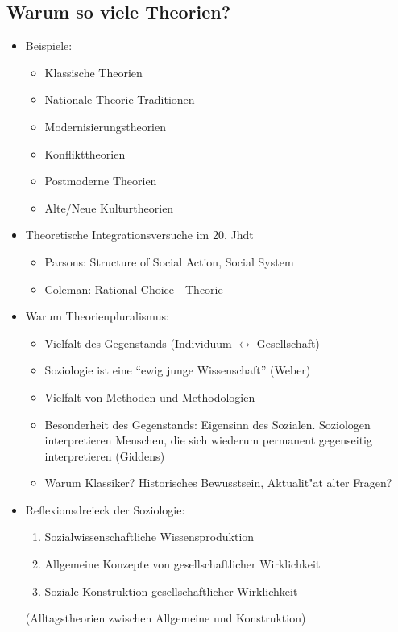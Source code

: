 \subsection{Warum so viele Theorien?}
\begin{itemize}
	\item
		Beispiele:
		\begin{itemize}
			\item
				Klassische Theorien
			\item
				Nationale Theorie-Traditionen
			\item
				Modernisierungstheorien
			\item
				Konflikttheorien
			\item
				Postmoderne Theorien
			\item
				Alte/Neue Kulturtheorien
		\end{itemize}
	\item
		Theoretische Integrationsversuche im 20. Jhdt
		\begin{itemize}
			\item
				Parsons: Structure of Social Action, Social System
			\item
				Coleman: Rational Choice - Theorie
		\end{itemize}
	\item
		Warum Theorienpluralismus:
		\begin{itemize}
			\item
				Vielfalt des Gegenstands (Individuum $\leftrightarrow$ Gesellschaft)
			\item
				Soziologie ist eine \enquote{ewig junge Wissenschaft} (Weber)
			\item
				Vielfalt von Methoden und Methodologien
			\item
				Besonderheit des Gegenstands: Eigensinn des Sozialen. Soziologen interpretieren Menschen, die sich wiederum permanent gegenseitig interpretieren (Giddens)
			\item
				Warum Klassiker? Historisches Bewusstsein, Aktualit"at alter Fragen?
		\end{itemize}
	\item
		Reflexionsdreieck der Soziologie:
		\begin{enumerate}
			\item
				Sozialwissenschaftliche Wissensproduktion
			\item
				Allgemeine Konzepte von gesellschaftlicher Wirklichkeit
			\item
				Soziale Konstruktion gesellschaftlicher Wirklichkeit
		\end{enumerate}
		(Alltagstheorien zwischen Allgemeine und Konstruktion)
\end{itemize}

